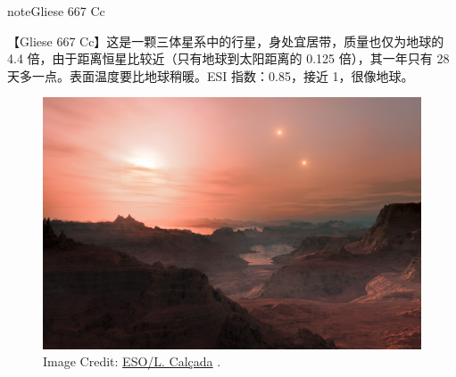 \documentclass[letterpaper,10pt,english]{sphinxmanual}
\begin{document}
\begin{notice}{note}{Gliese 667 Cc}

【Gliese 667 Cc】这是一颗三体星系中的行星，身处宜居带，质量也仅为地球的 4.4 倍，由于距离恒星比较近（只有地球到太阳距离的 0.125 倍），其一年只有 28 天多一点。表面温度要比地球稍暖。ESI 指数：0.85，接近 1，很像地球。
\begin{figure}[htbp]
\centering
\capstart

\includegraphics{Gliese_667_Cc_sunset.jpg}
\caption{Image Credit: \href{http://en.wikipedia.org/wiki/File:Gliese\_667\_Cc\_sunset.jpg}{ESO/L. Calçada} .}\end{figure}
\end{notice}
\end{document}
